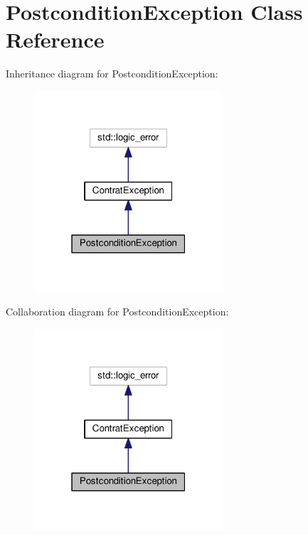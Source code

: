\hypertarget{classPostconditionException}{}\section{Postcondition\+Exception Class Reference}
\label{classPostconditionException}


Inheritance diagram for Postcondition\+Exception\+:\nopagebreak
\begin{figure}[H]
\begin{center}
\leavevmode
\includegraphics[width=199pt]{classPostconditionException__inherit__graph}
\end{center}
\end{figure}


Collaboration diagram for Postcondition\+Exception\+:\nopagebreak
\begin{figure}[H]
\begin{center}
\leavevmode
\includegraphics[width=199pt]{classPostconditionException__coll__graph}
\end{center}
\end{figure}
